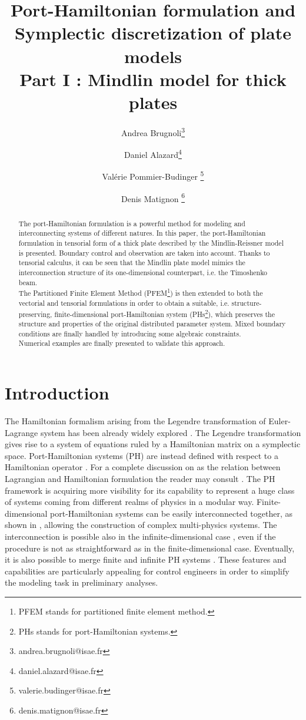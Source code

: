 \documentclass[11t]{article}
\title{Port-Hamiltonian formulation and \\ Symplectic discretization of plate models\\
	Part I : Mindlin model for thick plates}
\author[1]{Andrea Brugnoli\thanks{andrea.brugnoli@isae.fr}}
\author[1]{Daniel Alazard\thanks{daniel.alazard@isae.fr}}
\author[1]{Val\'erie Pommier-Budinger \thanks{valerie.budinger@isae.fr}}
\author[1]{Denis Matignon \thanks{denis.matignon@isae.fr}}
\affil[1]{ISAE-SUPAERO, Universit\'e de Toulouse, France. \\
	10 Avenue Edouard Belin, BP-54032, 31055 Toulouse Cedex 4.}
\begin{document}
\maketitle
	
	\begin{abstract}
			The port-Hamiltonian formulation is a powerful method  for modeling and interconnecting systems of different natures. In this paper, the port-Hamiltonian formulation in tensorial form of a thick plate described  by the Mindlin-Reissner model is presented. Boundary control and observation are taken into account. Thanks to tensorial calculus, it can be seen that the Mindlin plate model mimics the interconnection structure of its one-dimensional counterpart, i.e. the Timoshenko beam.\\
			The Partitioned Finite Element Method (PFEM\footnote{PFEM stands for partitioned finite element method.}) is then extended to both the vectorial and tensorial formulations in order to obtain a suitable, i.e. structure-preserving, finite-dimensional port-Hamiltonian system (PHs\footnote{PHs stands for port-Hamiltonian systems.}), which preserves the structure and properties of the original distributed parameter system. Mixed boundary conditions are finally handled by introducing some algebraic constraints. \\
			Numerical examples are finally presented to validate this approach. 
		\end{abstract}

	\section*{Introduction}
	The Hamiltonian formalism arising from the Legendre transformation of Euler-Lagrange system  has been already widely explored \cite{SymplecticElasticity}. The Legendre transformation gives rise to a system of equations ruled by a Hamiltonian matrix on a symplectic space. Port-Hamiltonian systems (PH) are instead defined with respect to a {Hamiltonian operator \cite[Chapter~7]{Olver}. For a complete discussion on as the relation between Lagrangian and Hamiltonian formulation the reader may consult \cite{MardsenDiraclAG_I, MardsenDiraclAG_II}.} The PH framework is acquiring more visibility for its capability to represent a huge class of systems coming from different realms of physics in a modular way. Finite-dimensional port-Hamiltonian systems can be easily interconnected together, as shown in \cite{Cervera2007}, allowing the construction of complex multi-physics systems. The interconnection is possible also in the infinite-dimensional case \cite{ShaftIntInfinite}, even if the procedure is not as straightforward as in the finite-dimensional case. Eventually, it is also possible to merge finite and infinite PH systems \cite{vanderShaftintFinInf}. These features and capabilities are particularly appealing for control engineers in order to simplify the modeling task in preliminary analyses.  \\
	
\end{document}
